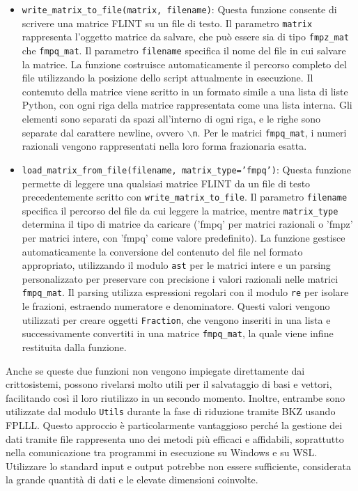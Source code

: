 \begin{itemize}
    \item \texttt{write\_matrix\_to\_file(matrix, filename)}: 
    Questa funzione consente di scrivere una matrice FLINT su un file di testo.
    Il parametro \texttt{matrix} rappresenta l'oggetto matrice da salvare, che può
    essere sia di tipo \texttt{fmpz\_mat} che \texttt{fmpq\_mat}. 
    Il parametro \texttt{filename} specifica il nome del file
    in cui salvare la matrice. La funzione costruisce automaticamente il percorso
    completo del file utilizzando la posizione dello script attualmente in esecuzione. Il contenuto
    della matrice viene scritto in un formato simile a una lista di liste Python,
    con ogni riga della matrice rappresentata come una lista interna. Gli elementi
    sono separati da spazi all'interno di ogni riga, e le righe sono separate dal
    carattere newline, ovvero \texttt{$\backslash$n}. Per le matrici \texttt{fmpq\_mat}, i
     numeri razionali
    vengono rappresentati nella loro forma frazionaria esatta.
    \item \texttt{load\_matrix\_from\_file(filename, matrix\_type='fmpq')}: 
    Questa funzione permette di leggere una qualsiasi matrice FLINT da un file di testo 
    precedentemente scritto con \texttt{write\_matrix\_to\_file}. 
    Il parametro \texttt{filename} specifica il percorso del file da cui leggere la matrice,
    mentre \texttt{matrix\_type} determina il tipo di matrice da caricare 
    ('fmpq' per matrici razionali o 'fmpz' per matrici intere, con 'fmpq' come valore 
    predefinito). La funzione
    gestisce automaticamente la conversione del contenuto del file nel formato appropriato,
    utilizzando il modulo \texttt{ast} per le matrici intere e un parsing personalizzato
    per preservare con precisione i valori razionali nelle matrici \texttt{fmpq\_mat}.
    Il parsing utilizza espressioni regolari con il modulo \texttt{re} per isolare le frazioni, 
    estraendo numeratore e denominatore. Questi valori vengono utilizzati per creare 
    oggetti \texttt{Fraction}, che vengono inseriti in una lista e successivamente convertiti 
    in una matrice \texttt{fmpq\_mat}, la quale viene infine restituita dalla funzione.

\end{itemize}
Anche se queste due funzioni non vengono impiegate direttamente dai crittosistemi, 
possono rivelarsi molto utili per il salvataggio di basi e vettori, facilitando così il 
loro riutilizzo in un secondo momento. Inoltre, entrambe sono utilizzate dal modulo 
\texttt{Utils} durante la fase di riduzione tramite BKZ usando FPLLL. Questo approccio è particolarmente 
vantaggioso perché la gestione dei dati tramite file rappresenta uno dei metodi più 
efficaci e affidabili, soprattutto nella comunicazione tra programmi in esecuzione su Windows e su
WSL. Utilizzare lo standard input e output potrebbe non essere 
sufficiente, considerata la grande quantità di dati e le elevate dimensioni coinvolte.

